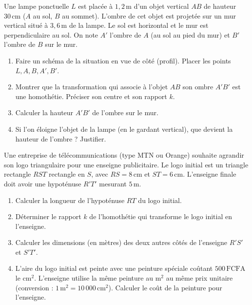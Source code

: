 \documentclass[11pt]{article}
\begin{document}
\begin{exercice}
Une lampe ponctuelle $L$ est placée à $1,2\,\text{m}$ d'un objet vertical $AB$ de hauteur $30\,\text{cm}$ ($A$ au sol, $B$ au sommet). L'ombre de cet objet est projetée sur un mur vertical situé à $3,6\,\text{m}$ de la lampe. Le sol est horizontal et le mur est perpendiculaire au sol. On note $A'$ l'ombre de $A$ (au sol au pied du mur) et $B'$ l'ombre de $B$ sur le mur.
\begin{enumerate}
\item Faire un schéma de la situation en vue de côté (profil). Placer les points $L, A, B, A', B'$.
\item Montrer que la transformation qui associe à l'objet $AB$ son ombre $A'B'$ est une homothétie. Préciser son centre et son rapport $k$.
\item Calculer la hauteur $A'B'$ de l'ombre sur le mur.
\item Si l'on éloigne l'objet de la lampe (en le gardant vertical), que devient la hauteur de l'ombre ? Justifier.
\end{enumerate}
\end{exercice}
\begin{exercice}
Une entreprise de télécommunications (type MTN ou Orange) souhaite agrandir son logo triangulaire pour une enseigne publicitaire. Le logo initial est un triangle rectangle $RST$ rectangle en $S$, avec $RS = 8\,\text{cm}$ et $ST = 6\,\text{cm}$. L'enseigne finale doit avoir une hypoténuse $R'T'$ mesurant $5\,\text{m}$.
\begin{enumerate}
\item Calculer la longueur de l'hypoténuse $RT$ du logo initial.
\item Déterminer le rapport $k$ de l'homothétie qui transforme le logo initial en l'enseigne.
\item Calculer les dimensions (en mètres) des deux autres côtés de l'enseigne $R'S'$ et $S'T'$.
\item L'aire du logo initial est peinte avec une peinture spéciale coûtant $500\,\text{FCFA}$ le $\text{cm}^2$. L'enseigne utilise la même peinture au $\text{m}^2$ au même prix unitaire (conversion : $1\,\text{m}^2 = 10\,000\,\text{cm}^2$). Calculer le coût de la peinture pour l'enseigne.
\end{enumerate}
\end{exercice}
\end{document}
